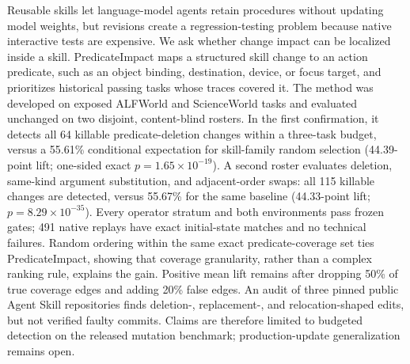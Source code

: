 Reusable skills let language-model agents retain procedures without updating model weights, but revisions create a regression-testing problem because native interactive tests are expensive. We ask whether change impact can be localized inside a skill. PredicateImpact maps a structured skill change to an action predicate, such as an object binding, destination, device, or focus target, and prioritizes historical passing tasks whose traces covered it. The method was developed on exposed ALFWorld and ScienceWorld tasks and evaluated unchanged on two disjoint, content-blind rosters. In the first confirmation, it detects all 64 killable predicate-deletion changes within a three-task budget, versus a 55.61\% conditional expectation for skill-family random selection (44.39-point lift; one-sided exact $p=1.65\times10^{-19}$). A second roster evaluates deletion, same-kind argument substitution, and adjacent-order swaps: all 115 killable changes are detected, versus 55.67\% for the same baseline (44.33-point lift; $p=8.29\times10^{-35}$). Every operator stratum and both environments pass frozen gates; 491 native replays have exact initial-state matches and no technical failures. Random ordering within the same exact predicate-coverage set ties PredicateImpact, showing that coverage granularity, rather than a complex ranking rule, explains the gain. Positive mean lift remains after dropping 50\% of true coverage edges and adding 20\% false edges. An audit of three pinned public Agent Skill repositories finds deletion-, replacement-, and relocation-shaped edits, but not verified faulty commits. Claims are therefore limited to budgeted detection on the released mutation benchmark; production-update generalization remains open.

